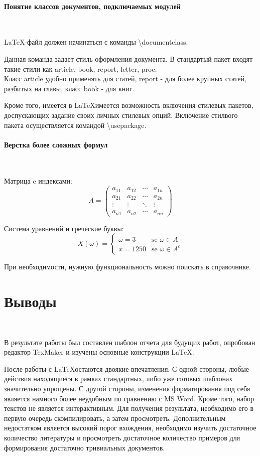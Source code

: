 \documentclass{article}
\begin{document}
\paragraph{Понятие классов документов, подключаемых модулей}
~

\LaTeX -файл должен начинаться с команды \textbackslash documentclass. 

Данная команда задает стиль оформления документа. В стандартый пакет входят такие стили как article, book, report, letter, proc. \\
Класс article удобно применять для статей, report - для более крупных статей, разбитых на главы, класс book - для книг.

Кроме того, имеется в \LaTeX имеется возможность включения стилевых пакетов, доспускающих задание своих личных стилевых опций. Включение стилвого пакета осуществляется командой \textbackslash usepackage.

\paragraph{Верстка более сложных формул}
~

Матрица c индексами:
$$
A = \begin{pmatrix}
a_{11} & a_{12} & \cdots & a_{1n} \\
a_{21} & a_{22} & \cdots & a_{2n} \\         
\vdots & \vdots & \ddots & \vdots \\
a_{n1} & a_{n2} & \cdots & a_{nn}
\end{pmatrix}
$$

Система уравнений и греческие буквы:
\begin{equation}
X(\omega) = 
 \begin{cases}
   \omega = 3 &\text{se $\omega\in A$}\\
   x = 1250 &\text{se $\omega \in A^c$}
 \end{cases}
\end{equation}

При необходимости, нужную функциональность можно поискать в справочнике.

\section{Выводы}
~

В результате работы был составлен шаблон отчета для будущих работ, опробован редактор TexMaker и изучены основные конструкции \LaTeX .

После работы с \LaTeX остаются двоякие впечатления. С одной стороны, любые действия находящиеся в рамках стандартных, либо уже готовых шаблонах значительно упрощены. С другой стороны, изменения форматирования под себя является намного более неудобным по сравнению с MS Word. Кроме того, набор текстов не является интерактивным. Для получения результата, необходимо его в первую очередь скомпилировать, а затем просмотреть. Дополнительным недостатком является высокий порог вхождения, необходимо изучить достаточное количество литературы и просмотреть достаточное количество примеров для формирования достаточно тривиальных документов.
\end{document}
